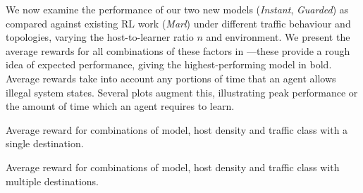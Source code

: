 \documentclass[10pt, times, conference, letterpaper]{IEEEtran}
\begin{document}
We now examine the performance of our two new models (\emph{Instant}, \emph{Guarded}) as compared against existing RL work (\emph{Marl}) under different traffic behaviour and topologies, varying the host-to-learner ratio $n$ and environment.
We present the average rewards for all combinations of these factors in ---these provide a rough idea of expected performance, giving the highest-performing model in bold.
Average rewards take into account any portions of time that an agent allows illegal system states.
Several plots augment this, illustrating peak performance or the amount of time which an agent requires to learn.

\begin{table}
	\centering
	\caption{Average reward for combinations of model, host density and traffic class with a single destination.\label{tab:av-vals}}
	
\end{table}
\begin{table}
	\centering
	\caption{Average reward for combinations of model, host density and traffic class with multiple destinations.\label{tab:av-ecmp-vals}}
	
\end{table}
\end{document}
